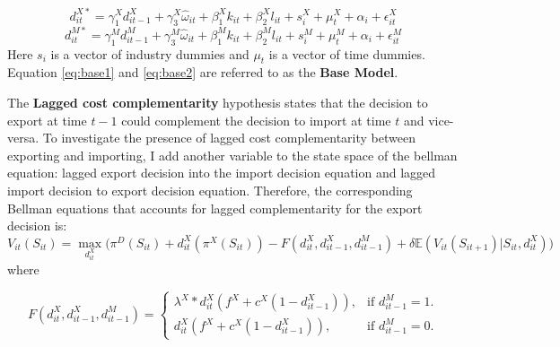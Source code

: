 \documentclass[12pt]{article}
\begin{document}

\begin{equation}
\label{eq:base1}
d_{it}^{X*} = \gamma_{1}^{X} d_{it-1}^{X} + 
\gamma_{3}^{X} \hat{\omega}_{it}  + \beta_{1}^{X}k_{it}  +\beta_{2}^{X}l_{it}+
s_{i}^{X} + \mu_{t}^{X}  + \alpha_{i}+\epsilon_{it}^{X}
\end{equation}
\begin{equation}
\label{eq:base2}
d_{it}^{M*} = \gamma_{1}^{M} d_{it-1}^{M} + 
\gamma_{3}^{M} \hat{\omega}_{it}  + \beta_{1}^{M}k_{it}  +\beta_{2}^{M}l_{it}+
s_{i}^{M} + \mu_{t}^{M}  + \alpha_{i}+\epsilon_{it}^{M}
\end{equation}
Here $s_{i}$ is a vector of industry dummies and $\mu_{t}$ is a vector
of time dummies. Equation \ref{eq:base1} and \ref{eq:base2} are
referred to as the \textbf{Base Model}.  






The \textbf{Lagged cost complementarity} hypothesis states that the
decision to export at time $t-1$  could complement the decision to import at
time $t$ and vice-versa. To investigate the presence of lagged cost complementarity between exporting and
importing, I add another variable to the state space of the bellman equation: lagged export
decision into the import decision equation and lagged import decision
to export decision equation. Therefore, the  corresponding Bellman equations that
accounts for lagged complementarity for the export decision is: 
\begin{equation}
\label{eq:belllagex}
V_{it}(S_{it})= \underset{d_{it}^{X}}{\max} \Big(\pi^{D}(S_{it}) + d_{it}^{X}(\pi^{X}(S_{it})) - F(d_{it}^{X},d_{it-1}^{X}, d_{it-1}^{M})
  + \delta \mathbb{E} (V_{it}(S_{it+1})|S_{it}, d_{it}^{X}) \Big)
\end{equation}
where 
 
\begin{equation}
  F(d_{it}^{X},d_{it-1}^{X}, d_{it-1}^{M})=\begin{cases}
   \lambda^{X} * d_{it}^{X}( f^{X} +c^{X}(1-d_{it-1}^{X})), & \text{if $d_{it-1}^{M}= 1$}.\\
   d_{it}^{X}( f^{X} +c^{X}(1-d_{it-1}^{X})) , & \text{if $d_{it-1}^{M}= 0$}.
  \end{cases}
\end{equation}
\end{document}
